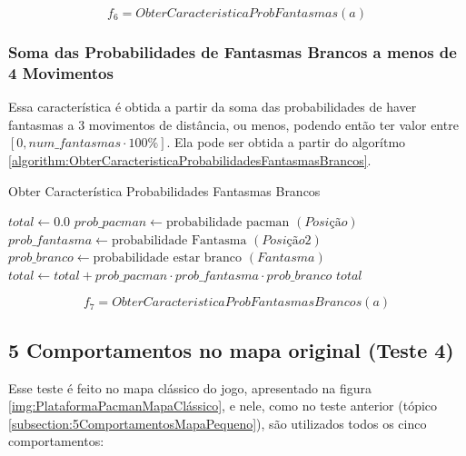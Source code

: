 $$ f_6 = ObterCaracteristicaProbFantasmas \left( a \right) $$

\subsubsection*{Soma das Probabilidades de Fantasmas Brancos a menos de 4 Movimentos}

Essa característica é obtida a partir da soma das probabilidades de haver fantasmas a 3 movimentos de distância, ou menos, podendo então ter valor entre $ \left[ 0, num\_fantasmas \cdot 100\% \right] $. Ela pode ser obtida a partir do algorítmo \ref{algorithm:ObterCaracteristicaProbabilidadesFantasmasBrancos}.

\begin{algorithm}[H]
	\caption{Obter Característica Probabilidades Fantasmas Brancos} \label{algorithm:ObterCaracteristicaProbabilidadesFantasmasBrancos}
	\begin{algorithmic}[1]
			\State $\textit{total} \gets 0.0 $
						\State $\textit{prob\_pacman} \gets \text{probabilidade pacman } \left( \textit{Posição} \right) $
							\State $\textit{prob\_fantasma} \gets \text{probabilidade Fantasma } \left( \textit{Posição2} \right) $
							\State $\textit{prob\_branco} \gets \text{probabilidade estar branco } \left( \textit{Fantasma} \right) $
							\State $\textit{total} \gets \textit{total} + \textit{prob\_pacman}  \cdot \textit{prob\_fantasma} \cdot \textit{prob\_branco} $
						\EndFor
					\EndIf
				\EndFor
			\EndFor
			\State \Return $ \textit{total} $
		\EndProcedure
	\end{algorithmic}
\end{algorithm}

$$ f_7 = ObterCaracteristicaProbFantasmasBrancos \left( a \right) $$

\subsection{5 Comportamentos no mapa original (Teste 4)} \label{subsection:5ComportamentosMapaOriginal}

Esse teste é feito no mapa clássico do jogo, apresentado na figura \ref{img:PlataformaPacmanMapaClássico}, e nele, como no teste anterior (tópico \ref{subsection:5ComportamentosMapaPequeno}), são utilizados todos os cinco comportamentos:

